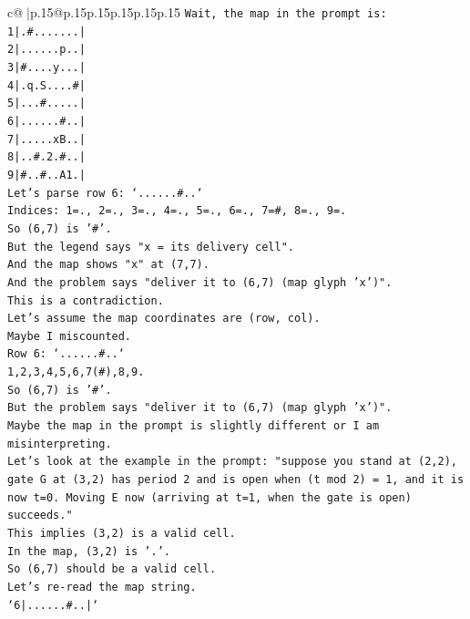 \documentclass{article}
\begin{document}
{\begin{supertabular}{c@{$\;$}|p{.15\linewidth}@{}p{.15\linewidth}p{.15\linewidth}p{.15\linewidth}p{.15\linewidth}p{.15\linewidth}}
{{{\texttt{Wait, the map in the prompt is:} \\
\texttt{1|.\#.......|} \\
\texttt{2|......p..|} \\
\texttt{3|\#....y...|} \\
\texttt{4|.q.S....\#|} \\
\texttt{5|...\#.....|} \\
\texttt{6|......\#..|} \\
\texttt{7|.....xB..|} \\
\texttt{8|..\#.2.\#..|} \\
\texttt{9|\#..\#..A1.|} \\
\texttt{Let's parse row 6: `......\#..`} \\
\texttt{Indices: 1=., 2=., 3=., 4=., 5=., 6=., 7=\#, 8=., 9=.} \\
\texttt{So (6,7) is '\#'.} \\
\texttt{But the legend says "x = its delivery cell".} \\
\texttt{And the map shows "x" at (7,7).} \\
\texttt{And the problem says "deliver it to (6,7) (map glyph 'x')".} \\
\texttt{This is a contradiction.} \\
\texttt{Let's assume the map coordinates are (row, col).} \\
\texttt{Maybe I miscounted.} \\
\texttt{Row 6: `......\#..`} \\
\texttt{1,2,3,4,5,6,7(\#),8,9.} \\
\texttt{So (6,7) is '\#'.} \\
\texttt{But the problem says "deliver it to (6,7) (map glyph 'x')".} \\
\texttt{Maybe the map in the prompt is slightly different or I am misinterpreting.} \\
\texttt{Let's look at the example in the prompt: "suppose you stand at (2,2), gate G at (3,2) has period 2 and is open when (t mod 2) = 1, and it is now t=0. Moving E now (arriving at t=1, when the gate is open) succeeds."} \\
\texttt{This implies (3,2) is a valid cell.} \\
\texttt{In the map, (3,2) is '.'.} \\
\texttt{So (6,7) should be a valid cell.} \\
\texttt{Let's re{-}read the map string.} \\
\texttt{`6|......\#..|`} \\
}}}
\end{supertabular}}
\end{document}
